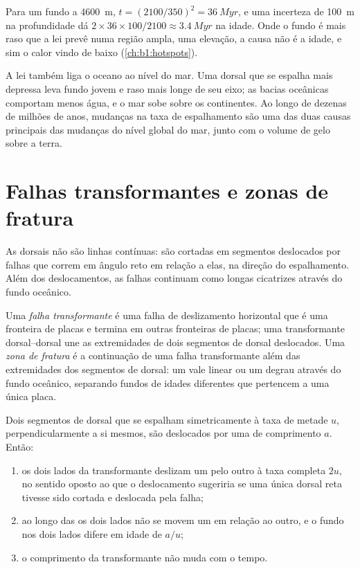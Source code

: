Para um fundo a \qty{4600}{m}, $t = (2100/350)^2 = \qty{36}{Myr}$, e uma
incerteza de \qty{100}{m} na profundidade dá $2\times36\times100/2100 \approx
\qty{3.4}{Myr}$ na idade. Onde o fundo é mais raso que a lei prevê numa região ampla, uma elevação, a causa não é a idade, e sim o calor vindo de baixo
(\cref{ch:b1:hotspots}).

A lei também liga o oceano ao nível do mar. Uma dorsal que se espalha mais depressa leva fundo jovem e raso mais longe de seu eixo; as bacias oceânicas comportam menos água, e o mar sobe sobre os continentes. Ao longo de dezenas de milhões de anos, mudanças na taxa de espalhamento são uma das duas causas principais das mudanças do nível global do mar, junto com o volume de gelo sobre a terra.

\section{Falhas transformantes e zonas de fratura}

As dorsais não são linhas contínuas: são cortadas em segmentos deslocados por falhas
que correm em ângulo reto em relação a elas, na direção do espalhamento. Além dos deslocamentos, as falhas continuam como longas cicatrizes
através do fundo oceânico.

\begin{definition}\label{def:b1:rifts-ridges-margins:transform}
Uma \emph{falha transformante} é uma falha de deslizamento horizontal que é uma fronteira de placas e termina em outras fronteiras de placas; uma transformante dorsal--dorsal une as extremidades de dois segmentos de dorsal deslocados. Uma \emph{zona de fratura} é a continuação de uma falha transformante além das
extremidades dos segmentos de dorsal: um vale linear ou um degrau através do fundo oceânico, separando fundos de idades diferentes que pertencem a uma única placa.
\end{definition}

\begin{proposition}\label{prop:b1:rifts-ridges-margins:transform}
Dois segmentos de dorsal que se espalham simetricamente à taxa de metade $u$, perpendicularmente
a si mesmos, são deslocados por uma  de comprimento $a$. Então:
\begin{enumerate}
  \item os dois lados da transformante deslizam um pelo outro à taxa completa
        $2u$, no sentido oposto ao que o deslocamento sugeriria se uma
        única dorsal reta tivesse sido cortada e deslocada pela falha;
  \item ao longo das  os dois lados não se movem um em relação ao outro, e o fundo nos dois lados difere em idade de $a/u$;
  \item o comprimento da transformante não muda com o tempo.
\end{enumerate}
\end{proposition}

